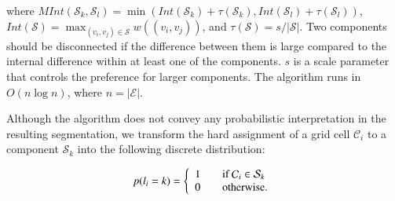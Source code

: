 where $MInt(\mathcal{S}_k,\mathcal{S}_l)=\min(Int(\mathcal{S}_k)+
\tau(\mathcal{S}_k),Int(\mathcal{S}_l)+\tau(\mathcal{S}_l))$,
$Int(\mathcal{S})=\max_{(v_i,v_j)\in\mathcal{S}} w((v_i,v_j))$, and
$\tau(\mathcal{S})=s/|\mathcal{S}|$. Two components should be disconnected if
the difference between them is large compared to the internal difference within
at least one of the components. $s$ is a scale parameter that controls the
preference for larger components. The algorithm runs in $O(n\log n)$, where
$n=|\mathcal{E}|$.

Although the algorithm does not convey any probabilistic interpretation in the
resulting segmentation, we transform the hard assignment of a grid cell
$\mathcal{C}_i$ to a component $\mathcal{S}_k$ into the following discrete
distribution:

\begin{equation}
\label{eqn:label_dist}
p(l_i=k) = \left\{
\begin{array}{l l}
1 & \quad \text{if $\mathcal{C}_i\in\mathcal{S}_k$}\\
0 & \quad \text{otherwise}.
\end{array} \right.
\end{equation}
